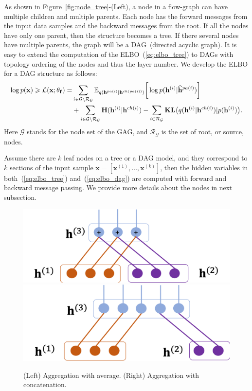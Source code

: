 \documentclass{article} %
\begin{document}
As shown in Figure~\ref{fig:node_tree}-(Left), a node in a flow-graph can have multiple children and multiple parents.
Each node has the forward messages from the input data samples and the backward messages from the root.  
If all the nodes have only one parent, then the structure becomes a tree. 
If there several nodes have multiple parents, the graph will be a DAG~(directed acyclic graph). 
It is easy to extend the computation of the ELBO~(\ref{eq:elbo_tree}) to DAGs with topology ordering  of the nodes and thus the layer number. 
We develop the ELBO for a DAG structure as follows:
\begin{align}  \notag
 \log p(\mathbf{x}) \geqslant \mathcal{L}(\mathbf{x}; \theta_{\mathbf{f}}) 
= &  \sum_{i \in \mathcal{G}  \setminus  \mathcal{R}_{ \mathcal{G} }  }  \mathbb{E}_{q(\mathbf{h}^{pa(i)}|\mathbf{h}^{ch(pa(i))})} \bigg[ \log p( \mathbf{h}^{(i)}|  \widehat{\mathbf{h}}^{pa(i)})   \bigg]\\
 & +  \sum_{i \in \mathcal{G}  \setminus  \mathcal{R}_{ \mathcal{G} }  } \textbf{\text{H}}(\mathbf{h}^{(i)} | \mathbf{h}^{ch(i)} )   -    \sum_{i \in  \mathcal{R}_{ \mathcal{G} }  }  \textbf{\text{KL}}\big(q(\mathbf{h}^{(i)} | \mathbf{h}^{ch(i)} )   | p(\mathbf{h}^{(i)})  \big) . \label{eq:elbo_dag}
 \end{align}
Here $\mathcal{G}$ stands for the node set of the GAG, and $\mathcal{R}_{ \mathcal{G}}$ is the set of root, or source, nodes. 

Assume there are $k$ leaf nodes on a tree or a DAG model, and they correspond to $k$ sections of the input sample $\mathbf{x} = [\mathbf{x}^{(1)}, ..., \mathbf{x}^{(k)}]$, then the hidden variables in both~(\ref{eq:elbo_tree}) and~(\ref{eq:elbo_dag}) are computed with forward and backward message passing. 
We provide more details about the nodes in next subsection.
 
\begin{figure}[!htbp] %
\begin{center}
 \includegraphics[width=0.43\linewidth]{fig/node_aggre_sum.png}
 \includegraphics[width=0.43\linewidth]{fig/node_aggre_cat.png}
\end{center}
   \caption{(Left) Aggregation with average. (Right) Aggregation with concatenation. }
\label{fig:node_aggre}
\end{figure}
\end{document}
